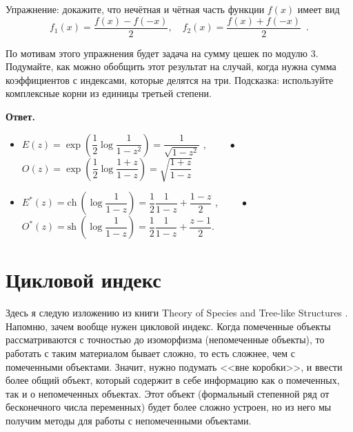 \documentclass{article}
\theoremstyle{definition}
\begin{document}
Упражнение: докажите, что нечётная и чётная часть функции \( f(x) \) имеет вид
\[
    f_{1}(x) = \dfrac{f(x) - f(-x)}{2}, \quad
    f_{2}(x) = \dfrac{f(x) + f(-x)}{2} \enspace . 
\]

По мотивам этого упражнения будет задача на сумму цешек по модулю 3. Подумайте,
как можно обобщить этот результат на случай, когда нужна сумма коэффициентов с
индексами, которые делятся на три. Подсказка: используйте комплексные корни из
единицы третьей степени.

\textbf{Ответ.}

\begin{itemize}
	\item \( E(z) = \exp\left(\dfrac12 \log \dfrac{1}{1-z^2}\right) = 
	\dfrac{1}{\sqrt{1 - z^2}} \) , 
	\( \qquad \bullet \) \( O(z) = \exp\left(\dfrac12 \log 
	\dfrac{1+z}{1-z}\right) = 
	\sqrt{\dfrac{1+z}{1-z}} \)
	\item \( E^{*}(z) = \mathrm{ch}\ \left(\log \dfrac{1}{1 - z}\right) = 
	\dfrac12 \dfrac{1}{1 - z} + \dfrac{1 - z}{2} \) , \( \qquad \bullet \)
	\( O^{*}(z) = \mathrm{sh}\ \left( \log \dfrac{1}{1 - z}\right) = 
	\dfrac12\dfrac{1}{1 - z} + \dfrac{z - 1}{2} \).
\end{itemize}

\section{Цикловой индекс}

Здесь я следую изложению из книги Theory of Species and Tree-like Structures 
\cite{species}. Напомню, зачем вообще нужен цикловой индекс. Когда помеченные
объекты рассматриваются с точностью до изоморфизма (непомеченные объекты), то
работать с таким материалом бывает сложно, то есть сложнее, чем с помеченными
объектами. Значит, нужно подумать <<вне коробки>>, и ввести более общий объект,
который содержит в себе информацию как о помеченных, так и о непомеченных
объектах. Этот объект (формальный степенной ряд от бесконечного числа
переменных) будет более сложно устроен, но из него мы получим методы для работы
с непомеченными объектами. 
\end{document}
